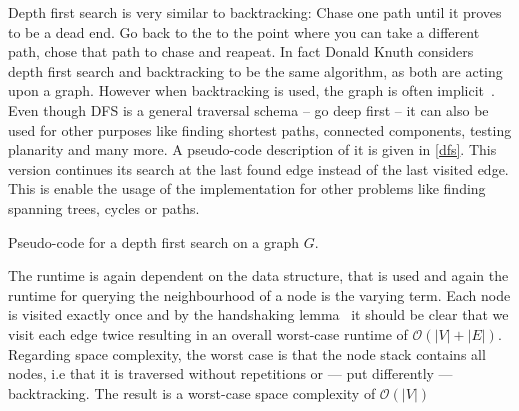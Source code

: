         Depth first search is very similar to backtracking: Chase one path until it proves to be a dead end. 
        Go back to the to the point where you can take a different path, chose that path to chase and reapeat. In fact Donald Knuth considers depth first search and backtracking to be the same algorithm, as both are acting upon a graph. However when backtracking is used, the graph is often implicit~\autocite{Knuth2000DancingL}.\\
        
        Even though DFS is a general traversal schema -- go deep first -- it can also be used for other purposes like finding shortest paths, connected components, testing planarity and many more. A pseudo-code description of it is given in \ref{dfs}. This version continues its search at the last found edge instead of the last visited edge. This is enable the usage of the implementation for other problems like finding spanning trees, cycles or paths.
        
        \begin{algorithm}[htp]
            \hrulealg
        \caption{Pseudo-code for a depth first search on a graph $G$.}\label{dfs}
        \end{algorithm}
        
        The runtime is again dependent on the data structure, that is used and again the runtime for querying the neighbourhood of a node is the varying term. Each node is visited exactly once and by the handshaking lemma~\autocite{Gross1998GraphTA} it should be clear that we visit each edge twice resulting in an overall worst-case runtime of $\mathcal{O}(|V|+|E|)$. Regarding space complexity, the worst case is that the node stack contains all nodes, i.e that it is traversed without repetitions or --- put differently --- backtracking. The result is a worst-case space complexity of $\mathcal{O}(|V|)$
        

